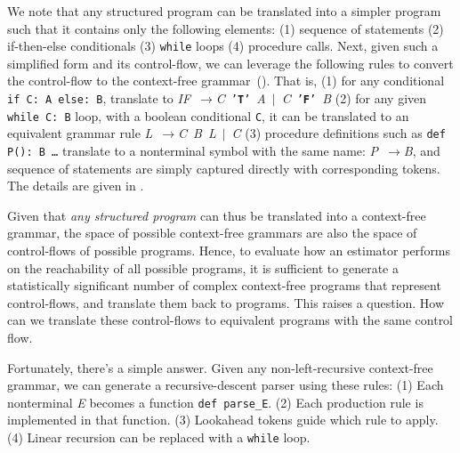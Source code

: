 \documentclass[conference]{IEEEtran}
\def\<#1>{\texttt{#1}}
\def\term#1{\texttt{'\textbf{#1}'}}
\def\nonterm#1{\textlangle\textnormal{\emph{#1}}\textrangle}
\def\expandsto{\(\rightarrow{}\)}
\begin{document}
We note that any structured program can be translated into a simpler program
such that it contains only the following elements:
(1) sequence of statements
(2) if-then-else conditionals
(3) \<while> loops
(4) procedure calls.
Next, given such a simplified form and its control-flow,
we can leverage the following rules to convert the control-flow to the context-free grammar~().
That is,
(1) for any conditional \<if C: A else: B>, translate to
  \mbox{\nonterm{IF} \expandsto \nonterm{C} \term{T} \nonterm{A}  $|$ \nonterm{C} \term{F} \nonterm{B}}
(2) for any given \<while C: B> loop, with a boolean conditional \<C>,
it can be translated to an equivalent grammar rule
\mbox{\nonterm{L} \expandsto \nonterm{C} \nonterm{B} \nonterm{L} $|$ \nonterm{C}}
(3) procedure definitions such as \<def P(): B \ldots> translate to a nonterminal symbol with the same
name: \mbox{\nonterm{P} \expandsto \nonterm{B}}, and sequence of statements are simply captured
directly with corresponding tokens.
The details are given in .

Given that \emph{any structured program} can thus be translated into a
context-free grammar, the space of possible context-free grammars are also
the space of control-flows of possible programs. Hence, to evaluate how
an estimator performs on the reachability of all possible programs, it is
sufficient to generate a statistically significant number of complex
context-free programs that represent control-flows, and translate them back
to programs. This raises a question. How can we translate these control-flows
to equivalent programs with the same control flow.

Fortunately, there's a simple answer. Given any non-left-recursive context-free
grammar, we can generate a recursive-descent parser using these rules:
(1) Each nonterminal \nonterm{E} becomes a function \<def parse\_E>.
(2) Each production rule is implemented in that function.
(3) Lookahead tokens guide which rule to apply.
(4) Linear recursion can be replaced with a \<while> loop.
\end{document}
